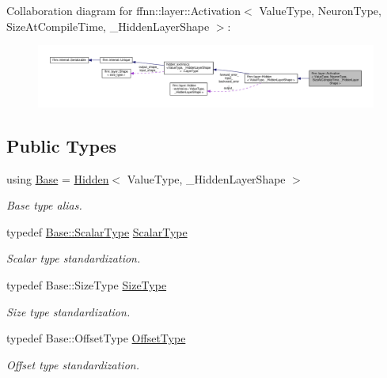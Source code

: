 Collaboration diagram for ffnn\-:\-:layer\-:\-:Activation$<$ Value\-Type, Neuron\-Type, Size\-At\-Compile\-Time, \-\_\-\-Hidden\-Layer\-Shape $>$\-:\nopagebreak
\begin{figure}[H]
\begin{center}
\leavevmode
\includegraphics[width=350pt]{classffnn_1_1layer_1_1_activation__coll__graph}
\end{center}
\end{figure}
\subsection*{Public Types}
\begin{DoxyCompactItemize}
\item 
using \hyperlink{classffnn_1_1layer_1_1_activation_a2f462178d98a5439e13962796c483459}{Base} = \hyperlink{classffnn_1_1layer_1_1_hidden}{Hidden}$<$ Value\-Type, \-\_\-\-Hidden\-Layer\-Shape $>$
\begin{DoxyCompactList}\small\item\em Base type alias. \end{DoxyCompactList}\item 
typedef \hyperlink{classffnn_1_1layer_1_1_layer_a3d482813f86f1ec69554b4592c478c32}{Base\-::\-Scalar\-Type} \hyperlink{classffnn_1_1layer_1_1_activation_a4ca1ce43c5be7e5b8950af7cb262daca}{Scalar\-Type}
\begin{DoxyCompactList}\small\item\em Scalar type standardization. \end{DoxyCompactList}\item 
typedef Base\-::\-Size\-Type \hyperlink{classffnn_1_1layer_1_1_activation_a6a7b6dd86eb70b72a179ce9951fb1149}{Size\-Type}
\begin{DoxyCompactList}\small\item\em Size type standardization. \end{DoxyCompactList}\item 
typedef Base\-::\-Offset\-Type \hyperlink{classffnn_1_1layer_1_1_activation_aac891b2d2a76bcf6035f53ed6abb94dc}{Offset\-Type}
\begin{DoxyCompactList}\small\item\em Offset type standardization. \end{DoxyCompactList}\end{DoxyCompactItemize}
